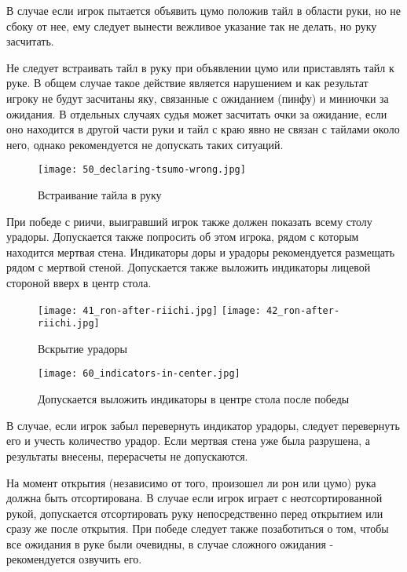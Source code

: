 В случае если игрок пытается объявить цумо положив тайл в области руки, но не сбоку от нее, ему следует вынести вежливое указание так не делать, но руку засчитать. 

\newpage

Не следует встраивать тайл в руку при объявлении цумо или приставлять тайл к руке. В общем случае такое действие является нарушением и как результат игроку не будут засчитаны яку, связанные с ожиданием (пинфу) и миниочки за ожидания. В отдельных случаях судья может засчитать очки за ожидание, если оно находится в другой части руки и тайл с краю явно не связан с тайлами около него, однако рекомендуется не допускать таких ситуаций.

\begin{figure}[H]
	\centering
	\texttt{[image: 50\_declaring-tsumo-wrong.jpg]}
	\caption{Встраивание тайла в руку}
\end{figure}

При победе с риичи, выигравший игрок также должен показать всему столу урадоры. Допускается также попросить об этом игрока, рядом с которым находится мертвая стена. Индикаторы доры и урадоры рекомендуется размещать рядом с мертвой стеной. Допускается также выложить индикаторы лицевой стороной вверх в центр стола.

\begin{figure}[H]
	\centering
	\texttt{[image: 41\_ron-after-riichi.jpg]}
	\texttt{[image: 42\_ron-after-riichi.jpg]}
	\caption{Вскрытие урадоры}
\end{figure}

\begin{figure}[H]
	\centering
	\texttt{[image: 60\_indicators-in-center.jpg]}
	\caption{Допускается выложить индикаторы в центре стола после победы}
\end{figure}

В случае, если игрок забыл перевернуть индикатор урадоры, следует перевернуть его и учесть количество урадор. Если мертвая стена уже была разрушена, а результаты внесены, перерасчеты не допускаются.

На момент открытия (независимо от того, произошел ли рон или цумо) рука должна быть отсортирована. В случае если игрок играет с неотсортированной рукой, допускается отсортировать руку непосредственно перед открытием или сразу же после открытия. При победе следует также позаботиться о том, чтобы все ожидания в руке были очевидны, в случае сложного ожидания - рекомендуется озвучить его.

